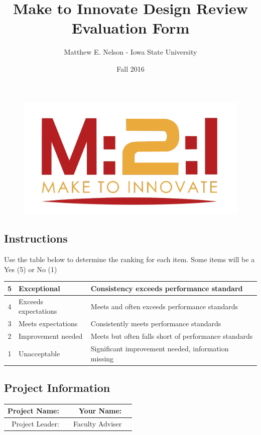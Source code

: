 \documentclass [10pt]{article}
\begin{document}
\title{Make to Innovate Design Review Evaluation Form}
\author{Matthew E. Nelson - Iowa State University}
\date{Fall 2016}
\begin{figure}
	\includegraphics[scale=.28]{M2I_Logo_transparent.png}
\end{figure}
\subsection*{Instructions}
\begin{scriptsize}
Use the table below to determine the ranking for each item.  Some items will be a Yes (5) or No (1)\ \\

\begin{tabular}{|c|l|l|}
\hline
5 & Exceptional & Consistency exceeds performance standard\\ \hline
4 & Exceeds expectations & Meets and often exceeds performance standards\\ \hline
3 & Meets expectations & Consistently meets performance standards\\ \hline
2 & Improvement needed & Meets but often falls short of performance standards\\ \hline
1 & Unacceptable & Significant improvement needed, information missing\\ \hline

\end{tabular}
\end{scriptsize}
\subsection*{Project Information}
\begin{tabular}{ |r|p{5cm}|r|p{5cm}|}
\hline
Project Name: & & Your Name: & \\ \hline
Project Leader: & &Faculty Adviser&\\ \hline
\end{tabular}
\end{document}
